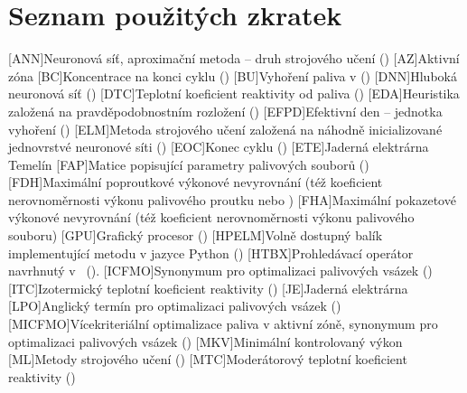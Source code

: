 \section*{Seznam použitých zkratek}
\begin{acronym}[TDMA]
[ANN]{Neuronová síť, aproximační metoda -- druh strojového učení ()}
[AZ]{Aktivní zóna}
[BC]{Koncentrace  na konci cyklu ()}
[BU]{Vyhoření paliva v  ()}
[DNN]{Hluboká neuronová síť ()}
[DTC]{Teplotní koeficient reaktivity od paliva ()}
[EDA]{Heuristika založená na pravděpodobnostním rozložení ()}
[EFPD]{Efektivní den -- jednotka vyhoření ()}
[ELM]{Metoda strojového učení založená na náhodně inicializované jednovrstvé neuronové síti ()}
[EOC]{Konec cyklu ()}
[ETE]{Jaderná elektrárna Temelín}
[FAP]{Matice popisující parametry palivových souborů ()}
[FDH]{Maximální poproutkové výkonové nevyrovnání (též koeficient nerovnoměrnosti výkonu palivového proutku nebo )}
[FHA]{Maximální pokazetové výkonové nevyrovnání (též koeficient nerovnoměrnosti výkonu palivového souboru)}
[GPU]{Grafický procesor ()}
[HPELM]{Volně dostupný balík implementující metodu  v jazyce Python ()}
[HTBX]{Prohledávací operátor navrhnutý v~\cite{parks} ().}
[ICFMO]{Synonymum pro optimalizaci palivových vsázek ()}
[ITC]{Izotermický teplotní koeficient reaktivity ()}
[JE]{Jaderná elektrárna}
[LPO]{Anglický termín pro optimalizaci palivových vsázek ()}
[MICFMO]{Vícekriteriální optimalizace paliva v aktivní zóně, synonymum pro optimalizaci palivových vsázek ()}
[MKV]{Minimální kontrolovaný výkon}
[ML]{Metody strojového učení ()}
[MTC]{Moderátorový teplotní koeficient reaktivity ()}

\end{acronym}
